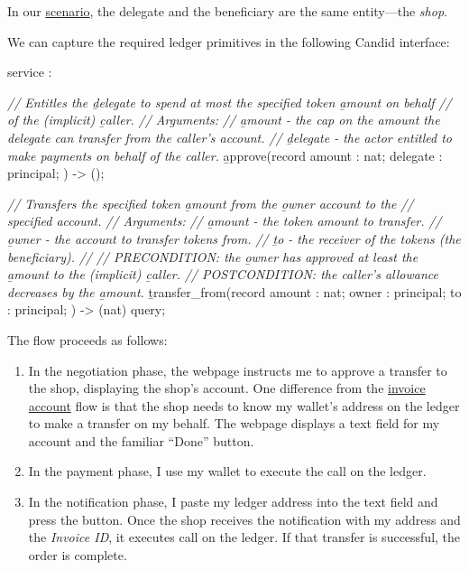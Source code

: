 \documentclass{article}
\begin{document}
In our \href{#payment-scenario}{scenario}, the delegate and the beneficiary are the same entity---the \emph{shop}.

We can capture the required ledger primitives in the following Candid interface:
\begin{code}[candid]
service : {
  \emph{// Entitles the \b{delegate} to spend at most the specified token \b{amount} on behalf}
  \emph{// of the (implicit) \b{caller}.}
  \emph{// Arguments:}
  \emph{//   \b{amount} - the cap on the amount the delegate can transfer from the caller's account.}
  \emph{//   \b{delegate} - the actor entitled to make payments on behalf of the caller.}
  \b{approve}(record {
    amount : nat;
    delegate : principal;
  }) -> ();

  \emph{// Transfers the specified token \b{amount} from the \b{owner} account to the}
  \emph{// specified account.}
  \emph{// Arguments:}
  \emph{//   \b{amount} - the token amount to transfer.}
  \emph{//   \b{owner} - the account to transfer tokens from.}
  \emph{//   \b{to} - the receiver of the tokens (the beneficiary).}
  \emph{//}
  \emph{// PRECONDITION: the \b{owner} has approved at least the \b{amount} to the (implicit) \b{caller}.}
  \emph{// POSTCONDITION: the caller's allowance decreases by the \b{amount}.}
  \b{transfer_from}(record {
    amount : nat;
    owner : principal;
    to : principal;
  }) -> (nat) query;
}
\end{code}

The flow proceeds as follows:
\begin{enumerate}
  \item
    In the negotiation phase, the webpage instructs me to approve a transfer to the shop, displaying the shop's account.
    One difference from the \href{#invoice-account}{invoice account} flow is that the shop needs to know my wallet's address on the ledger to make a transfer on my behalf.
    The webpage displays a text field for my account and the familiar ``Done'' button.
  \item In the payment phase, I use my wallet to execute the  call on the ledger.
  \item
    In the notification phase, I paste my ledger address into the text field and press the button.
    Once the shop receives the notification with my address and the \emph{Invoice ID}, it executes  call on the ledger.
    If that transfer is successful, the order is complete.
\end{enumerate}
\end{document}
